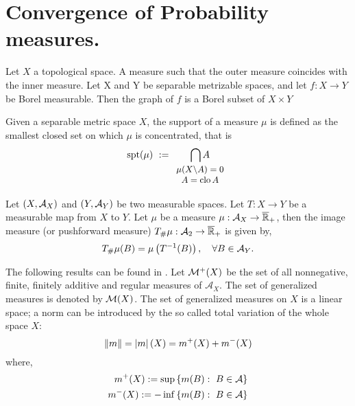 \section{Convergence of Probability measures.}

Let $X$ a topological space. A measure such that the outer measure coincides with the inner measure. Let X and Y be separable metrizable spaces, and let $f: X \to Y$ be Borel measurable. Then the graph of $f$ is a Borel subset of $X\times Y$
\begin{definition}
	Given a separable metric space $X$, the support of a measure $\mu$ is defined as the smallest closed set on which $\mu$ is concentrated, that is
	\begin{equation}
	\spt(\mu)\ :=\underset{\small{\begin{array}{c}
			\mu(X\backslash A)=0\\ A=\closu A  \end{array}}}{\bigcap A} 		
	\end{equation} 
\end{definition}
\begin{definition}
	Let $\left( X, \mathcal{A}_X \right)$  and $\left( Y, \mathcal{A}_Y \right)$ be two measurable spaces. Let $T:X\rightarrow Y$ be a measurable map from $X$ to $Y$. Let $\mu$ be a measure $\mu: \mathcal{A}_X\rightarrow \overline{\mathbb{R}}_+$, then the image measure (or pushforward measure) ${T}_{\#} \mu:\mathcal{A}_2\rightarrow \overline{\mathbb{R}}_+$ is given by,
	\begin{equation*}
	{T}_{\#} \mu(B) = \mu\left( T^{-1}(B) \right), \quad \forall B \in \mathcal{A}_Y.
	\end{equation*}
\end{definition}

The following results can be found in \cite{Milan2000TpicsWeakconvProbs}.
Let $\mathcal{M}^+(X)$ be the set of all nonnegative, finite, finitely additive and regular measures of $\mathcal{A}_X$. The set of generalized measures is denoted by $\mathcal{M}(X)$. The set of generalized measures on $X$ is a linear space; a norm can be introduced by the so called total variation of the whole space $X$:
\begin{equation}
	\left\|m\right\|=\left| m \right|(X)=m^+(X)+m^-(X)
\end{equation}
where, 
\begin{align*}
	m^+(X):=\sup\left\lbrace m(B):\ B \in \mathcal{A} \right\rbrace \\
	m^-(X):=-\inf\left\lbrace m(B):\ B \in \mathcal{A} \right\rbrace
\end{align*}

